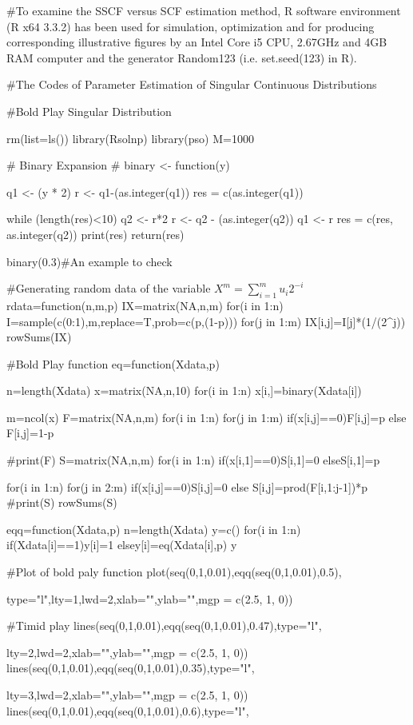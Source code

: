 
#To examine the SSCF versus SCF estimation method, R software environment (R x64 3.3.2) has been used for simulation, optimization and for producing corresponding illustrative figures by an Intel Core i5 CPU, 2.67GHz and 4GB RAM computer and the generator Random123 (i.e. set.seed(123) in R). 

#The Codes of Parameter Estimation of Singular Continuous Distributions

#Bold Play Singular Distribution

rm(list=ls())
library(Rsolnp)
library(pso)
M=1000

# Binary Expansion #
binary <- function(y) {
  q1 <- (y * 2) 
  r <- q1-(as.integer(q1))
  res = c(as.integer(q1))

  while (length(res)<10) {
   q2 <- r*2
   r <- q2 - (as.integer(q2))
   q1 <- r
   res = c(res, as.integer(q2))
 print(res)
  }
  return(res)
}

binary(0.3)#An example to check

#Generating random data of the variable $X^m=\sum_{i=1}^{m} u_{i}2^{-i}$
rdata=function(n,m,p){
IX=matrix(NA,n,m)
for(i in 1:n){
I=sample(c(0:1),m,replace=T,prob=c(p,(1-p)))
for(j in 1:m){
IX[i,j]=I[j]*(1/(2^j))
}
}
rowSums(IX)
}

#Bold Play function
eq=function(Xdata,p){
n=length(Xdata)
x=matrix(NA,n,10)
for(i in 1:n)
{
x[i,]=binary(Xdata[i])
}

m=ncol(x)
F=matrix(NA,n,m)
for(i in 1:n)
{
for(j in 1:m)
{
if(x[i,j]==0){F[i,j]=p}
  else {F[i,j]=1-p
}
}
}

#print(F)
S=matrix(NA,n,m)
for(i in 1:n)
{
if(x[i,1]==0){S[i,1]=0}
   else{S[i,1]=p}
}

for(i in 1:n)
{
for(j in 2:m)
{
if(x[i,j]==0){S[i,j]=0}
   else {S[i,j]=prod(F[i,1:j-1])*p}
}
}
#print(S)
rowSums(S)
}

eqq=function(Xdata,p){
n=length(Xdata)
y=c()
for(i in 1:n)
{
if(Xdata[i]==1){y[i]=1}
else{y[i]=eq(Xdata[i],p)
}
}
y
}

#Plot of bold paly function
plot(seq(0,1,0.01),eqq(seq(0,1,0.01),0.5),

type="l",lty=1,lwd=2,xlab="",ylab="",mgp = c(2.5, 1, 0))

#Timid play
lines(seq(0,1,0.01),eqq(seq(0,1,0.01),0.47),type="l",

lty=2,lwd=2,xlab="",ylab="",mgp = c(2.5, 1, 0))
lines(seq(0,1,0.01),eqq(seq(0,1,0.01),0.35),type="l",

lty=3,lwd=2,xlab="",ylab="",mgp = c(2.5, 1, 0))
lines(seq(0,1,0.01),eqq(seq(0,1,0.01),0.6),type="l",

